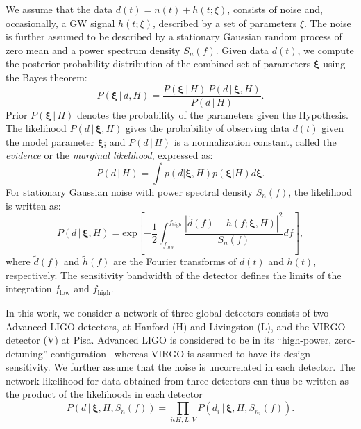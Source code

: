 \documentclass[prd,preprintnumbers,twocolumn,eqsecnum,floatfix,a4paper,nofootinbib,superscriptaddress]{revtex4}
\newcommand{\bxi}{\bm{\xi}}
\begin{document}
We assume that the data $d(t) = n(t) + h(t;\xi)$, consists of noise and, occasionally, a GW signal $h(t;\xi)$, described by a set of parameters $\xi$. The noise is further assumed to be described by a stationary Gaussian random process of zero mean and a power spectrum density $S_n(f)$. Given data $d(t)$, we compute the posterior probability distribution of the combined set of parameters ${\bxi}$ using the Bayes theorem: 
\begin{equation}
P({\bxi} \, | \, d, H) = \frac{P({\bxi} \, | \, H) \, P (d \, | \, {\bxi}, H)}{P(d \, | \, H)}.
\label{eq:Bayes_theorem}
\end{equation} 
Prior $P({\bxi} \, | \, H)$ denotes the probability of the parameters given the Hypothesis.  The likelihood $P (d \, | \, {\bxi}, H)$ gives the probability of observing data $d(t)$ given the model parameter $\bxi$; and $P(d \, | \, H)$ is a normalization constant, called the \emph{evidence} or the \emph{marginal likelihood}, expressed as:
 \begin{equation}
 P(d \, | \, H)=\int p(d|\bxi, H)p(\bxi | H)d\bxi.
 \label{eq:evidence}
 \end{equation}
For stationary Gaussian noise with power spectral density $S_n(f)$, the likelihood is written as:
\begin{equation}
P (d \, | \, {\bxi}, H) = \text{exp}\left[ -\frac{1}{2}\int_{f_\mathrm{low}}^{f_\mathrm{high}} \frac{|\tilde{d}(f) - \tilde{h}(f;{\bxi}, H)|^2}{S_n(f)}df\right],
\end{equation}
where $\tilde{d}(f)$ and $\tilde{h}(f)$ are the Fourier transforms of $d(t)$ and $h(t)$, respectively. The sensitivity bandwidth of the detector defines the limits of the integration $f_\mathrm{low}$ and $f_\mathrm{high}$. 

In this work, we consider a network of three global detectors consists of two Advanced LIGO detectors, at Hanford (H) and Livingston (L), and the VIRGO detector (V) at Pisa. Advanced LIGO is considered to be in its ``high-power, zero-detuning'' configuration~\cite{aLIGOZeroDetHighPower} whereas VIRGO is assumed to have its design-sensitivity. We further assume that the noise is uncorrelated in each detector. The network likelihood for data obtained from three detectors can thus be written as the product of the likelihoods in each detector
\begin{equation}
P (d \, | \, {\bxi}, H, S_n(f)) = \prod_{i \epsilon {H,L,V}} P (d_{i} \, | \, {\bxi}, H, S_{n_{i}}(f)).
\end{equation}
\end{document}
